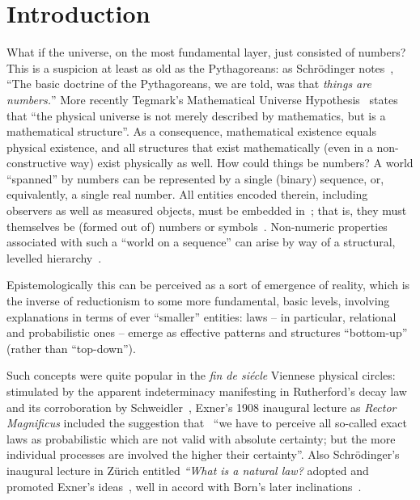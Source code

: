 \documentclass[12pt]{article}
\begin{document}
\section{Introduction}
\label{2018-was-sec1}
What if the universe, on the most fundamental layer, just consisted of numbers?
This is a suspicion at least as old as the Pythagoreans:
as Schr\"odinger notes~\cite[Chapter~III]{schroed:natgr}, ``The basic doctrine of the Pythagoreans, we are told,
was that {\em things are numbers.}'' More recently Tegmark's Mathematical Universe
Hypothesis~\cite{tegmark2007,tegmark2014} states that ``the physical universe is not merely described by
mathematics, but is a mathematical structure''. As a consequence, mathematical existence equals physical existence, and
all structures that exist mathematically (even in a non-constructive way) exist physically as well.
How could things be numbers? A world ``spanned'' by numbers can be represented by a single (binary) sequence,
or, equivalently,  a single real number.
All entities encoded therein, including observers as well as measured objects, must be embedded
in~\cite{toffoli:79,svozil-94};
that is, they must themselves be (formed out of) numbers  or symbols~\cite{borges-library}.
Non-numeric properties associated with such a ``world on a sequence''
can arise by way of a structural, levelled hierarchy~\cite{anderson:73}.

Epistemologically this can be perceived as
a sort of emergence of reality, which is the inverse
of reductionism to some more fundamental, basic levels, involving explanations in terms of ever ``smaller'' entities:
laws  -- in particular, relational and probabilistic ones --  emerge as effective patterns
and structures ``bottom-up'' (rather than ``top-down'').




Such concepts were quite popular in the  {\it fin de si\'ecle} Viennese physical circles: stimulated by
the apparent indeterminacy manifesting  in Rutherford's decay law
and its corroboration  by Schweidler~\cite{schweidler-1905}, Exner's 1908 inaugural lecture as {\it Rector Magnificus}
included the suggestion that~\cite[p.~18]{Exner-1908}  ``we have
to perceive all so-called exact laws as probabilistic which are not valid with
absolute certainty; but the more individual processes are involved the higher their certainty''.
Also Schr\"odinger's inaugural lecture in Z\"urich entitled {\em ``What is a natural law?}
adopted and promoted Exner's ideas~\cite{schrodinger-1929,book:16081},
well in accord with Born's later inclinations~\cite{born-26-1}.
\end{document}
